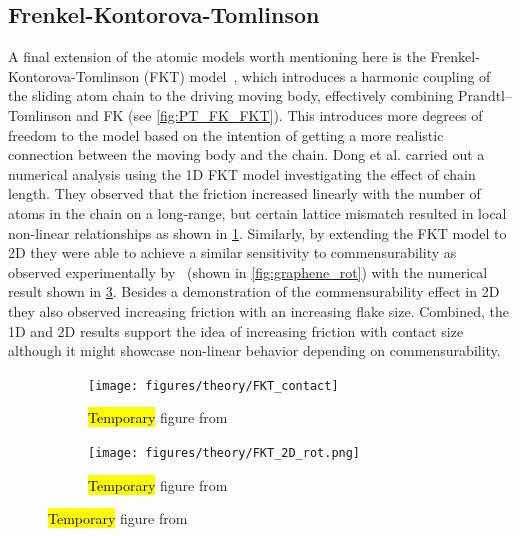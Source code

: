 \subsection{Frenkel-Kontorova-Tomlinson}
A final extension of the atomic models worth mentioning here is the
Frenkel-Kontorova-Tomlinson (\acrshort{FKT}) model~\cite{weiss_dry_1997}, which
introduces a harmonic coupling of the sliding atom chain to the driving moving
body, effectively combining Prandtl–Tomlinson and \acrshort{FK} (see \cref{fig:PT_FK_FKT}). This introduces
more degrees of freedom to the model based on the intention of getting a more realistic connection between the moving body and the chain. Dong et al. carried out a numerical analysis using the 1D \acrshort{FKT} model investigating the effect of chain length. They observed that the friction increased linearly with the number of atoms in the chain on a long-range, but certain lattice mismatch resulted in local non-linear relationships as shown in \cref{fig:FKT_contact}. Similarly, by extending the \acrshort{FKT} model to 2D they were able to achieve a similar sensitivity to commensurability as observed experimentally by~\cite{DIENWIEBEL2005197} (shown in
\cref{fig:graphene_rot}) with the numerical result shown in \cref{fig:FKT_2D_rot}. Besides a demonstration of the commensurability effect in 2D they also observed increasing friction with an increasing flake size. Combined, the 1D and 2D results support the idea of increasing friction with contact size although it might showcase non-linear behavior depending on commensurability.


\begin{figure}[H]
  \centering
  \begin{subfigure}[t]{0.49\textwidth}
      \centering
      \texttt{[image: figures/theory/FKT\_contact]}
      \label{fig:FKT_contact}
      \caption{\hl{Temporary} figure from~\cite{Yalin_2011} }
  \end{subfigure}
  \hfill
  \begin{subfigure}[t]{0.49\textwidth}
      \centering
      \texttt{[image: figures/theory/FKT\_2D\_rot.png]}
      \label{fig:FKT_2D_rot}
      \caption{\hl{Temporary} figure from~\cite{Yalin_2011} }
  \end{subfigure}
  \hfill
\end{figure}



